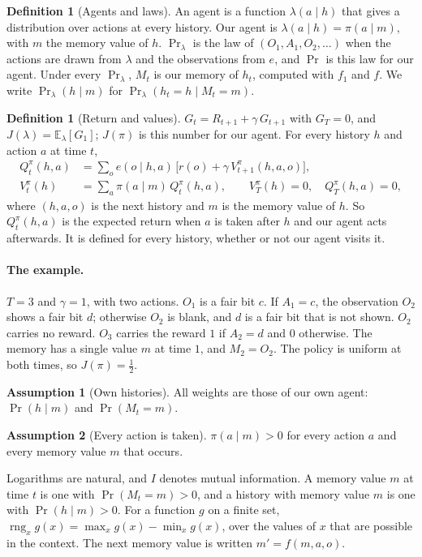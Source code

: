 \documentclass{article}
\theoremstyle{definition}
\newtheorem{definition}[proposition]{Definition}
\newtheorem{assumption}{Assumption}
\newcommand{\E}{\mathbb{E}}
\newcommand{\Prl}{\Pr\nolimits_{\lambda}}
\newcommand{\rng}{\operatorname{rng}}
\begin{document}
\begin{definition}[Agents and laws]\label{def:agent}
An agent is a function $\lambda(a\mid h)$ that gives a distribution over actions at every history. Our agent is $\lambda(a\mid h)=\pi(a\mid m)$, with $m$ the memory value of $h$. $\Prl$ is the law of $(O_1,A_1,O_2,\dots)$ when the actions are drawn from $\lambda$ and the observations from $e$, and $\Pr$ is this law for our agent. Under every $\Prl$, $M_t$ is our memory of $h_t$, computed with $f_1$ and $f$. We write $\Prl(h\mid m)$ for $\Prl(h_t=h\mid M_t=m)$.
\end{definition}

\begin{definition}[Return and values]\label{def:value}
$G_t=R_{t+1}+\gamma\,G_{t+1}$ with $G_T=0$, and $J(\lambda)=\E_\lambda[G_1]$; $J(\pi)$ is this number for our agent. For every history $h$ and action $a$ at time $t$,
\begin{align}
Q^\pi_t(h,a)&=\sum_o e(o\mid h,a)\,\big[r(o)+\gamma\,V^\pi_{t+1}(h,a,o)\big], \label{eq:bellman}\\
V^\pi_t(h)&=\sum_a\pi(a\mid m)\,Q^\pi_t(h,a),\qquad V^\pi_T(h)=0,\quad Q^\pi_T(h,a)=0, \nonumber
\end{align}
where $(h,a,o)$ is the next history and $m$ is the memory value of $h$. So $Q^\pi_t(h,a)$ is the expected return when $a$ is taken after $h$ and our agent acts afterwards. It is defined for every history, whether or not our agent visits it.
\end{definition}

\paragraph{The example.} $T=3$ and $\gamma=1$, with two actions. $O_1$ is a fair bit $c$. If $A_1=c$, the observation $O_2$ shows a fair bit $d$; otherwise $O_2$ is blank, and $d$ is a fair bit that is not shown. $O_2$ carries no reward. $O_3$ carries the reward $1$ if $A_2=d$ and $0$ otherwise. The memory has a single value $m$ at time $1$, and $M_2=O_2$. The policy is uniform at both times, so $J(\pi)=\tfrac12$.

\begin{assumption}[Own histories]\label{as:own}
All weights are those of our own agent: $\Pr(h\mid m)$ and $\Pr(M_t=m)$.
\end{assumption}
\begin{assumption}[Every action is taken]\label{as:pos}
$\pi(a\mid m)>0$ for every action $a$ and every memory value $m$ that occurs.
\end{assumption}
Logarithms are natural, and $I$ denotes mutual information. A memory value $m$ at time $t$ is one with $\Pr(M_t=m)>0$, and a history with memory value $m$ is one with $\Pr(h\mid m)>0$. For a function $g$ on a finite set, $\rng_xg(x)=\max_xg(x)-\min_xg(x)$, over the values of $x$ that are possible in the context. The next memory value is written $m'=f(m,a,o)$.
\end{document}
